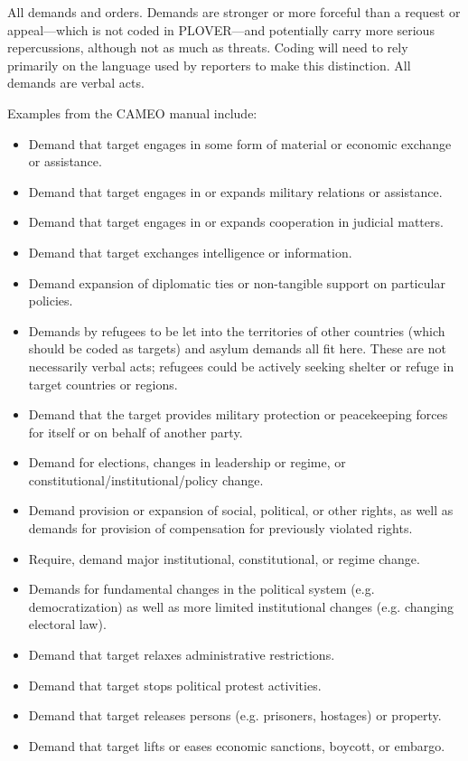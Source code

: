 \documentclass[11pt]{report}
\begin{document}
All demands and orders. Demands are stronger or more forceful than a request or appeal---which is not coded in PLOVER---and potentially carry more serious repercussions, although not as much as threats. Coding will need to rely primarily on the language used by reporters to make this distinction.  All demands are verbal acts. 

Examples from the CAMEO manual include:

\begin{itemize}
\item Demand that target engages in some form of material or economic exchange or assistance.
\item Demand that target engages in or expands military relations or assistance.
\item Demand that target engages in or expands cooperation in judicial matters.
\item Demand that target exchanges intelligence or information.
\item Demand expansion of diplomatic ties or non-tangible support on particular policies.
\item Demands by refugees to be let into the territories of other countries (which should be coded as targets) and asylum demands all fit here. These are not necessarily verbal acts; refugees could be actively seeking shelter or refuge in target countries or regions.
\item Demand that the target provides military protection or peacekeeping forces  for itself or on behalf of another party.
\item Demand for elections, changes in leadership or regime, or constitutional/institutional/policy change.
\item Demand provision or expansion of social, political, or other rights, as well as demands for provision of compensation for previously violated rights.
\item Require, demand major institutional, constitutional, or regime change.
\item Demands for fundamental changes in the political system (e.g. democratization) as well as more limited institutional changes (e.g. changing electoral law).
\item Demand that target relaxes administrative restrictions.
\item Demand that target stops political protest activities.
\item Demand that target releases persons (e.g. prisoners, hostages) or property.
\item Demand that target lifts or eases economic sanctions, boycott, or embargo.

\end{itemize}
\end{document}
